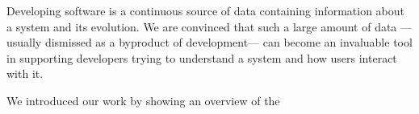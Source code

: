 


Developing software is a continuous source of data containing information about a system and its evolution.
We are convinced that such a large amount of data ---usually dismissed as a byproduct of development--- can become an invaluable tool in supporting developers trying to understand a system and how users interact with it.

We introduced our work by showing an overview of the
